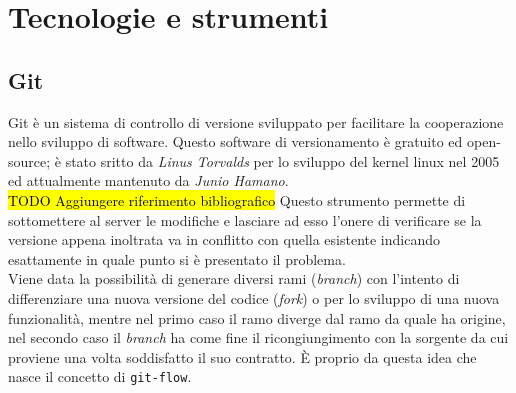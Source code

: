 \section{Tecnologie e strumenti}
\subsection{Git}

Git è un sistema di controllo di versione sviluppato per facilitare la cooperazione nello sviluppo di software. Questo software di versionamento è gratuito ed open-source;  è stato sritto  da \textit{Linus Torvalds} per lo sviluppo del kernel linux nel 2005 ed attualmente mantenuto da \textit{Junio Hamano}. \\
\hl{TODO Aggiungere riferimento bibliografico}
Questo strumento permette di sottomettere al server le modifiche e lasciare ad esso l'onere di verificare se la versione appena inoltrata va in conflitto con quella esistente indicando esattamente in quale punto si è presentato il problema. \\
Viene data la possibilità di generare diversi rami (\textit{branch}) con l'intento di differenziare una nuova versione del codice (\textit{fork}) o per lo sviluppo di una nuova funzionalità, mentre nel primo caso il ramo diverge dal ramo da quale ha origine, nel secondo caso il \textit{branch} ha come fine il ricongiungimento con la sorgente da cui proviene una volta soddisfatto il suo contratto. È proprio da questa idea che nasce il concetto di \texttt{git-flow}.

